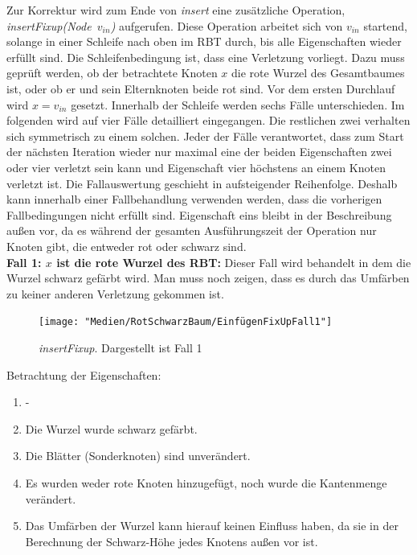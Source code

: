 \documentclass[a4paper,12pt]{article}
\begin{document}
\noindent Zur Korrektur wird zum Ende von \textit{insert} eine zusätzliche Operation,\\  \mbox{\textit{insertFixup(Node $v_{in}$)}} aufgerufen. Diese Operation arbeitet sich von $v_{in}$ startend, solange in einer Schleife nach oben im RBT durch, bis alle Eigenschaften wieder erfüllt sind. Die Schleifenbedingung ist, dass eine Verletzung vorliegt. Dazu muss geprüft werden, ob der betrachtete Knoten $x$ die rote Wurzel des Gesamtbaumes ist, oder ob er und sein Elternknoten beide rot sind. Vor dem ersten Durchlauf wird $x = v_{in}$ gesetzt. Innerhalb der Schleife werden sechs Fälle unterschieden. Im folgenden wird auf vier Fälle detailliert eingegangen. Die restlichen zwei verhalten sich symmetrisch zu einem solchen. Jeder der Fälle verantwortet, dass zum Start der nächsten Iteration wieder nur maximal eine der beiden Eigenschaften zwei oder vier verletzt sein kann und Eigenschaft vier höchstens an einem Knoten verletzt ist. Die Fallauswertung geschieht in aufsteigender Reihenfolge. Deshalb kann innerhalb einer Fallbehandlung verwenden werden, dass die vorherigen Fallbedingungen nicht erfüllt sind. Eigenschaft eins bleibt in der Beschreibung außen vor, da es während der gesamten Ausführungszeit der Operation nur Knoten gibt, die entweder rot oder schwarz sind. \\

\noindent\textbf{Fall 1: $x$ ist die rote Wurzel des RBT: }
Dieser Fall wird behandelt in dem die Wurzel schwarz gefärbt wird. Man muss noch zeigen, dass es durch das Umfärben zu keiner anderen Verletzung gekommen ist.\\
\begin{figure}[H]
	\centering
	\texttt{[image: "Medien/RotSchwarzBaum/EinfügenFixUpFall1"]}
	\caption{\textit{insertFixup}. Dargestellt ist Fall 1  }
	\label{fig:EinfügenFixUpFall1}
\end{figure}

Betrachtung der Eigenschaften:
\begin{enumerate}
	\item -
	\item Die Wurzel wurde schwarz gefärbt.
	\item Die Blätter (Sonderknoten) sind unverändert.
	\item Es wurden weder rote Knoten hinzugefügt, noch wurde die Kantenmenge verändert. 
	\item Das Umfärben der Wurzel kann hierauf keinen Einfluss haben, da sie in der Berechnung der Schwarz-Höhe jedes Knotens außen vor ist.
\end{enumerate}  
\end{document}
